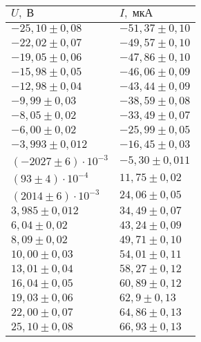 \begin{tabular}{|l|l|}
\hline
$U,\;\text{В}$ & $I,\;\text{мкА}$\\\hline
$-25{,}10 \pm 0{,}08$ & $-51{,}37 \pm 0{,}10$\\\hline
$-22{,}02 \pm 0{,}07$ & $-49{,}57 \pm 0{,}10$\\\hline
$-19{,}05 \pm 0{,}06$ & $-47{,}86 \pm 0{,}10$\\\hline
$-15{,}98 \pm 0{,}05$ & $-46{,}06 \pm 0{,}09$\\\hline
$-12{,}98 \pm 0{,}04$ & $-43{,}44 \pm 0{,}09$\\\hline
$-9{,}99 \pm 0{,}03$ & $-38{,}59 \pm 0{,}08$\\\hline
$-8{,}05 \pm 0{,}02$ & $-33{,}49 \pm 0{,}07$\\\hline
$-6{,}00 \pm 0{,}02$ & $-25{,}99 \pm 0{,}05$\\\hline
$-3{,}993 \pm 0{,}012$ & $-16{,}45 \pm 0{,}03$\\\hline
$\left(-2027 \pm 6\right)\cdot 10^{-3}$ & $-5{,}30 \pm 0{,}011$\\\hline
$\left(93 \pm 4\right)\cdot 10^{-4}$ & $11{,}75 \pm 0{,}02$\\\hline
$\left(2014 \pm 6\right)\cdot 10^{-3}$ & $24{,}06 \pm 0{,}05$\\\hline
$3{,}985 \pm 0{,}012$ & $34{,}49 \pm 0{,}07$\\\hline
$6{,}04 \pm 0{,}02$ & $43{,}24 \pm 0{,}09$\\\hline
$8{,}09 \pm 0{,}02$ & $49{,}71 \pm 0{,}10$\\\hline
$10{,}00 \pm 0{,}03$ & $54{,}01 \pm 0{,}11$\\\hline
$13{,}01 \pm 0{,}04$ & $58{,}27 \pm 0{,}12$\\\hline
$16{,}04 \pm 0{,}05$ & $60{,}89 \pm 0{,}12$\\\hline
$19{,}03 \pm 0{,}06$ & $62{,}9 \pm 0{,}13$\\\hline
$22{,}00 \pm 0{,}07$ & $64{,}86 \pm 0{,}13$\\\hline
$25{,}10 \pm 0{,}08$ & $66{,}93 \pm 0{,}13$\\\hline
\end{tabular}
